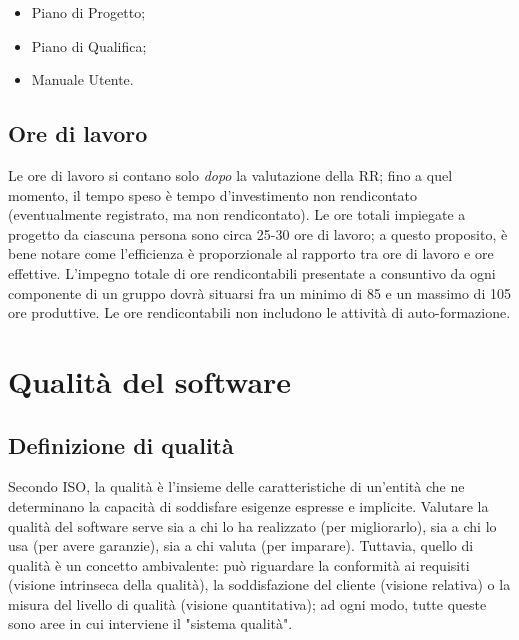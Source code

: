 \documentclass[a4paper]{article}
\begin{document}
	\begin{itemize}
		
			
	\item Piano di Progetto;
			
	\item Piano di Qualifica;
			
	\item Manuale Utente.
		
	\end{itemize}


		
	\subsection{Ore di lavoro}

		
Le ore di lavoro si contano solo \emph{dopo} la valutazione della RR; fino a quel momento, il tempo speso è tempo d'investimento non rendicontato (eventualmente registrato, ma non rendicontato). Le ore totali impiegate a progetto da ciascuna persona sono circa 25-30 ore di lavoro; a questo proposito, è bene notare come l'efficienza è proporzionale al rapporto tra ore di lavoro e ore effettive. L'impegno totale di ore rendicontabili presentate a consuntivo da ogni componente di un gruppo dovrà situarsi fra un minimo di 85 e un massimo di 105 ore produttive. Le ore rendicontabili non includono le attività di auto-formazione.
	


		
	\section{Qualità del software}


		
	\subsection{Definizione di qualità}

		
Secondo ISO, la qualità è l'insieme delle caratteristiche di un'entità che ne determinano la capacità di soddisfare esigenze espresse e implicite. Valutare la qualità del software serve sia a chi lo ha realizzato (per migliorarlo), sia a chi lo usa (per avere garanzie), sia a chi valuta (per imparare). Tuttavia, quello di qualità è un concetto ambivalente: può riguardare la conformità ai requisiti (visione intrinseca della qualità), la soddisfazione del cliente (visione relativa) o la misura del livello di qualità (visione quantitativa); ad ogni modo, tutte queste sono aree in cui interviene il "sistema qualità".
\end{document}
